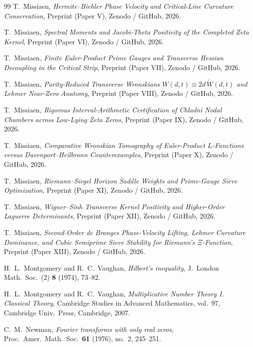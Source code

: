 \documentclass[11pt,reqno]{amsart}
\theoremstyle{definition}
\theoremstyle{remark}
\numberwithin{equation}{section}
\begin{document}
\begin{thebibliography}{99}
T.~Missiaen, \emph{Hermite--Biehler Phase Velocity and Critical-Line Curvature Conservation}, Preprint (Paper V), Zenodo / GitHub, 2026.

T.~Missiaen, \emph{Spectral Moments and Jacobi-Theta Positivity of the Completed Zeta Kernel}, Preprint (Paper VI), Zenodo / GitHub, 2026.

T.~Missiaen, \emph{Finite Euler-Product Prime Gauges and Transverse Hessian Decoupling in the Critical Strip}, Preprint (Paper VII), Zenodo / GitHub, 2026.

T.~Missiaen, \emph{Parity-Reduced Transverse Wronskians $W(d,t)\equiv 2d\,\widetilde{W}(d,t)$ and Lehmer Near-Zero Anatomy}, Preprint (Paper VIII), Zenodo / GitHub, 2026.

T.~Missiaen, \emph{Rigorous Interval-Arithmetic Certification of Chladni Nodal Chambers across Low-Lying Zeta Zeros}, Preprint (Paper IX), Zenodo / GitHub, 2026.

T.~Missiaen, \emph{Comparative Wronskian Tomography of Euler-Product $L$-Functions versus Davenport--Heilbronn Counterexamples}, Preprint (Paper X), Zenodo / GitHub, 2026.

T.~Missiaen, \emph{Riemann--Siegel Horizon Saddle Weights and Prime-Gauge Sieve Optimization}, Preprint (Paper XI), Zenodo / GitHub, 2026.

T.~Missiaen, \emph{Wigner--Sinh Transverse Kernel Positivity and Higher-Order Laguerre Determinants}, Preprint (Paper XII), Zenodo / GitHub, 2026.

T.~Missiaen, \emph{Second-Order de Branges Phase-Velocity Lifting, Lehmer Curvature Dominance, and Cubic Semiprime Sieve Stability for Riemann's $\Xi$-Function}, Preprint (Paper XIII), Zenodo / GitHub, 2026.

H.~L.~Montgomery and R.~C.~Vaughan, \emph{Hilbert's inequality}, J.\ London Math.\ Soc.\ (2) \textbf{8} (1974), 73--82.

H.~L.~Montgomery and R.~C.~Vaughan, \emph{Multiplicative Number Theory I. Classical Theory}, Cambridge Studies in Advanced Mathematics, vol.~97, Cambridge Univ.\ Press, Cambridge, 2007.

C.~M.~Newman, \emph{Fourier transforms with only real zeros}, Proc.\ Amer.\ Math.\ Soc.\ \textbf{61} (1976), no.~2, 245--251.


\end{thebibliography}
\end{document}
